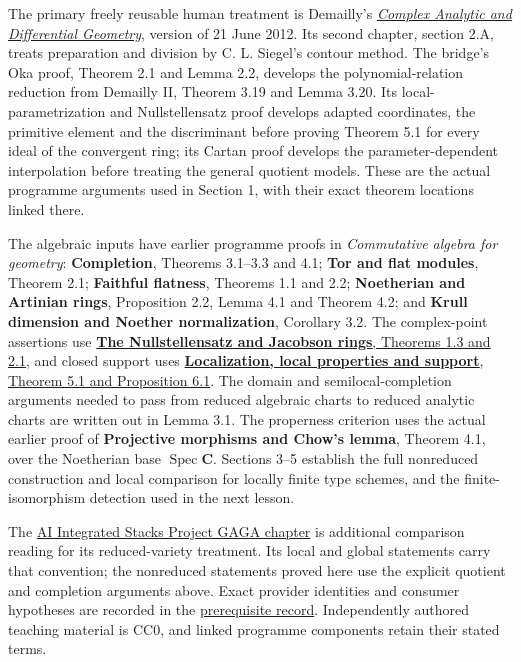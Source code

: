 \documentclass[11pt]{article}
\begin{document}
The primary freely reusable human treatment is Demailly's
\href{https://www-fourier.univ-grenoble-alpes.fr/~demailly/manuscripts/agbook.pdf}{\emph{Complex
Analytic and Differential Geometry}}, version of 21 June 2012. Its
second chapter, section 2.A, treats preparation and division by C. L.
Siegel's contour method. The bridge's Oka proof, Theorem 2.1 and Lemma
2.2, develops the polynomial-relation reduction from Demailly II,
Theorem 3.19 and Lemma 3.20. Its local-parametrization and
Nullstellensatz proof develops adapted coordinates, the primitive
element and the discriminant before proving Theorem 5.1 for every ideal
of the convergent ring; its Cartan proof develops the
parameter-dependent interpolation before treating the general quotient
models. These are the actual programme arguments used in Section 1, with
their exact theorem locations linked there.

The algebraic inputs have earlier programme proofs in \emph{Commutative
algebra for geometry}: \textbf{Completion}, Theorems 3.1--3.3 and 4.1;
\textbf{Tor and flat modules}, Theorem 2.1; \textbf{Faithful flatness},
Theorems 1.1 and 2.2; \textbf{Noetherian and Artinian rings},
Proposition 2.2, Lemma 4.1 and Theorem 4.2; and \textbf{Krull dimension
and Noether normalization}, Corollary 3.2. The complex-point assertions
use \href{https://github.com/KokunoYumeto/open-math-courses/blob/d18141573d82588960ab175843821f0b38ab8802/docs/courses/AG-CA/src/the-nullstellensatz-and-jacobson-rings.md}{\textbf{The Nullstellensatz and
Jacobson rings}, Theorems 1.3 and 2.1}, and closed support uses
\href{https://github.com/KokunoYumeto/open-math-courses/blob/d18141573d82588960ab175843821f0b38ab8802/docs/courses/AG-CA/src/localization-local-properties-and-support.md}{\textbf{Localization, local properties and
support}, Theorem 5.1 and Proposition 6.1}. The domain and
semilocal-completion arguments needed to pass from reduced algebraic
charts to reduced analytic charts are written out in Lemma 3.1. The
properness criterion uses the actual earlier proof of \textbf{Projective
morphisms and Chow's lemma}, Theorem 4.1, over the Noetherian base
\(\operatorname{Spec}\mathbf C\). Sections 3--5 establish the full
nonreduced construction and local comparison for locally finite type
schemes, and the finite-isomorphism detection used in the next lesson.

The
\href{https://kokunoyumeto.github.io/stacks-zh-hans-cn/en/gaga.html\#gaga-proposition-analytification}{AI
Integrated Stacks Project GAGA chapter} is additional comparison reading
for its reduced-variety treatment. Its local and global statements carry
that convention; the nonreduced statements proved here use the explicit
quotient and completion arguments above. Exact provider identities and
consumer hypotheses are recorded in the
\href{https://github.com/KokunoYumeto/open-math-courses/blob/d18141573d82588960ab175843821f0b38ab8802/docs/courses/AG-QC/prerequisites.json}{prerequisite record}. Independently authored
teaching material is CC0, and linked programme components retain their
stated terms.
\end{document}
